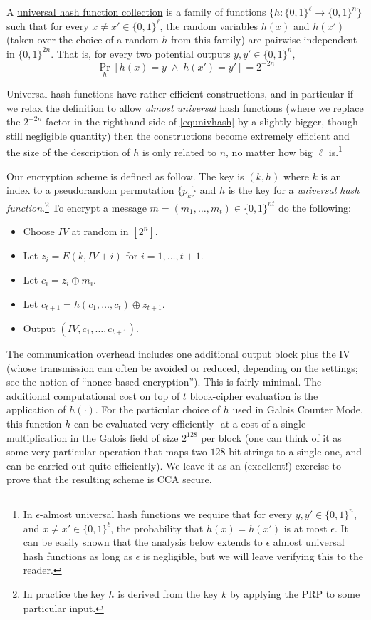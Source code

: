 A \href{https://goo.gl/jLpNtU}{universal hash function collection} is a
family of functions \(\{ h:\{0,1\}^\ell\rightarrow\{0,1\}^n \}\) such
that for every \(x \neq x' \in \{0,1\}^\ell\), the random variables
\(h(x)\) and \(h(x')\) (taken over the choice of a random \(h\) from
this family) are pairwise independent in \(\{0,1\}^{2n}\). That is, for
every two potential outputs \(y,y'\in \{0,1\}^n\), \[
\Pr_h[ h(x)=y \;\wedge\; h(x')=y']=2^{-2n} \label{equnivhash}
\]

Universal hash functions have rather efficient constructions, and in
particular if we relax the definition to allow \emph{almost universal}
hash functions (where we replace the \(2^{-2n}\) factor in the righthand
side of \eqref{equnivhash} by a slightly bigger, though still negligible
quantity) then the constructions become extremely efficient and the size
of the description of \(h\) is only related to \(n\), no matter how big
\(\ell\) is.\footnote{In \(\epsilon\)-almost universal hash functions we
  require that for every \(y,y'\in \{0,1\}^{n}\), and
  \(x\neq x' \in \{0,1\}^\ell\), the probability that \(h(x)= h(x')\) is
  at most \(\epsilon\). It can be easily shown that the analysis below
  extends to \(\epsilon\) almost universal hash functions as long as
  \(\epsilon\) is negligible, but we will leave verifying this to the
  reader.}

Our encryption scheme is defined as follow. The key is \((k,h)\) where
\(k\) is an index to a pseudorandom permutation \(\{ p_k \}\) and \(h\)
is the key for a \emph{universal hash function}.\footnote{In practice
  the key \(h\) is derived from the key \(k\) by applying the PRP to
  some particular input.} To encrypt a message
\(m = (m_1,\ldots,m_t) \in \{0,1\}^{nt}\) do the following:

\begin{itemize}
\item
  Choose \(\ensuremath{\mathit{IV}}\) at random in \([2^n]\).
\item
  Let \(z_i = E(k,\ensuremath{\mathit{IV}}+i)\) for \(i=1,\ldots,t+1\).
\item
  Let \(c_i = z_i \oplus m_i\).
\item
  Let \(c_{t+1} = h(c_1,\ldots,c_t) \oplus z_{t+1}\).
\item
  Output \((\ensuremath{\mathit{IV}},c_1,\ldots,c_{t+1})\).
\end{itemize}

The communication overhead includes one additional output block plus the
IV (whose transmission can often be avoided or reduced, depending on the
settings; see the notion of ``nonce based encryption''). This is fairly
minimal. The additional computational cost on top of \(t\) block-cipher
evaluation is the application of \(h(\cdot)\). For the particular choice
of \(h\) used in Galois Counter Mode, this function \(h\) can be
evaluated very efficiently- at a cost of a single multiplication in the
Galois field of size \(2^{128}\) per block (one can think of it as some
very particular operation that maps two \(128\) bit strings to a single
one, and can be carried out quite efficiently). We leave it as an
(excellent!) exercise to prove that the resulting scheme is CCA secure.

